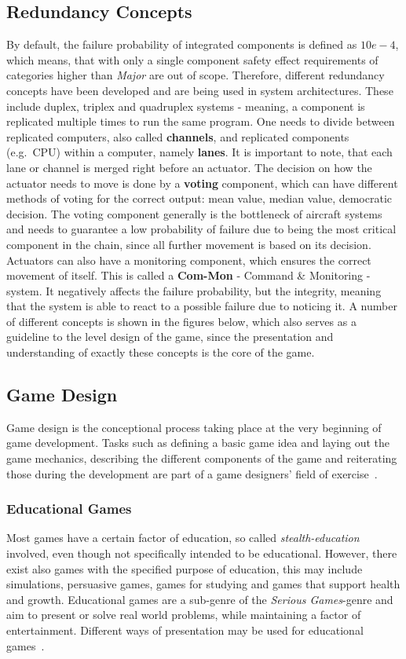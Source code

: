 \subsection{Redundancy Concepts}\label{subsec:redundancy-concepts}
By default, the failure probability of integrated components is defined as $10e-4$, which means, that with only a single component
safety effect requirements of categories higher than \textit{Major} are out of scope.
Therefore, different redundancy concepts have been developed and are being used in system architectures.
These include duplex, triplex and quadruplex systems - meaning, a component is replicated multiple times to run the same program.
One needs to divide between replicated computers, also called \textbf{channels}, and replicated components (e.g.\ CPU) within a computer,
namely \textbf{lanes}.
It is important to note, that each lane or channel is merged right before an actuator.
The decision on how the actuator needs to move is done by a \textbf{voting} component, which can have different methods of voting
for the correct output: mean value, median value, democratic decision.
The voting component generally is the bottleneck of aircraft systems and needs to guarantee a low probability of failure
due to being the most critical component in the chain, since all further movement is based on its decision.
Actuators can also have a monitoring component, which ensures the correct movement of itself.
This is called a \textbf{Com-Mon} - Command \& Monitoring - system.
It negatively affects the failure probability, but the integrity, meaning that the system is able to react to a possible failure due
to noticing it.
A number of different concepts is shown in the figures below, which also serves as a guideline to the level design of the game,
since the presentation and understanding of exactly these concepts is the core of the game.

\subsection{Game Design}\label{subsec:game-design}
Game design is the conceptional process taking place at the very beginning of game development.
Tasks such as defining a basic game idea and laying out the game mechanics, describing the different components of the game and
reiterating those during the development are part of a game designers' field of exercise~\cite{10.5555/2544002}.

\subsubsection{Educational Games}\label{subsubsec:educational-games}
Most games have a certain factor of education, so called \textit{stealth-education} involved, even though not
specifically intended to be educational.
However, there exist also games with the specified purpose of education, this may include simulations, persuasive games,
games for studying and games that support health and growth.
Educational games are a sub-genre of the \textit{Serious Games}-genre and aim to present or solve real world problems,
while maintaining a factor of entertainment.
Different ways of presentation may be used for educational games~\cite[p.43]{10.5555/2544002}.


